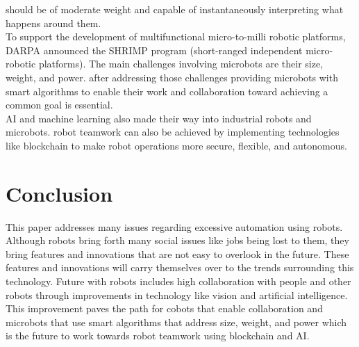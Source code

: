 \documentclass[a4paper, 11pt]{article}
\begin{document}
should be of moderate weight and capable of instantaneously interpreting what
happens around them. \\
To support the development of multifunctional micro-to-milli robotic
platforms, DARPA announced the SHRIMP program (short-ranged independent
micro-robotic platforms). The main challenges involving microbots are their
size, weight, and power. after addressing those challenges providing microbots 
with smart algorithms to enable their work and collaboration toward 
achieving a common goal is essential. \\
AI and machine learning also made their way into industrial robots and
microbots. robot teamwork can also be achieved by implementing technologies
like blockchain to make robot operations more secure, flexible, and autonomous.

\section{Conclusion}
This paper addresses many issues regarding excessive automation using
robots. Although robots bring forth many social issues like jobs being
lost to them, they bring features and innovations that are not easy to
overlook in the future. These features and innovations will carry themselves
over to the trends surrounding this technology. Future with robots includes
high collaboration with people and other robots through improvements in
technology like vision and artificial intelligence. This improvement
paves the path for cobots that enable collaboration and microbots
that use smart algorithms that address size, weight, and power which
is the future to work towards robot teamwork using blockchain and AI.


\end{document}
